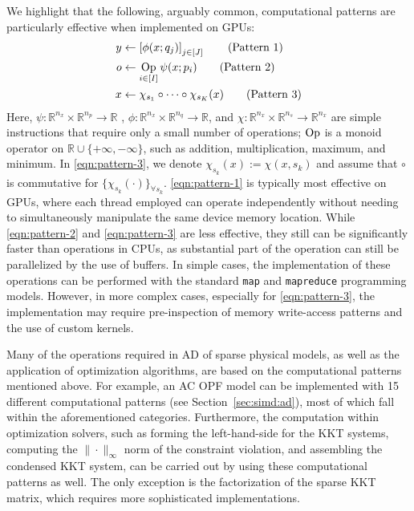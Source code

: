 We highlight that the following, arguably common, computational
patterns are particularly effective when implemented on GPUs:
\begin{align}
  y&\leftarrow \left[\phi(x; q_j)\right]_{j\in [J]}\tag{Pattern 1}\label{eqn:pattern-1}\\
  o&\leftarrow  \mathop{\rm{Op}}_{i\in [I]} \psi(x;p_i) \tag{Pattern 2}\label{eqn:pattern-2}\\
  x&\leftarrow  \chi_{s_1}\circ\cdots\circ \chi_{s_K}(x) \tag{Pattern 3}\label{eqn:pattern-3}
\end{align}
Here, $\psi:\mathbb{R}^{n_x}\times \mathbb{R}^{n_{p}}\rightarrow
\mathbb{R}$ , $\phi:\mathbb{R}^{n_x}\times
\mathbb{R}^{n_{q}}\rightarrow \mathbb{R}$, and
$\chi:\mathbb{R}^{n_x}\times \mathbb{R}^{n_{s}}\rightarrow
\mathbb{R}^{n_x}$ are simple instructions that require only a small number
of operations; $\mathop{\rm{Op}}$ is a monoid operator on
$\mathbb{R}\cup\{+\infty,-\infty\}$, such as addition, multiplication,
maximum, and minimum. In \ref{eqn:pattern-3}, we denote $\chi_{s_k}(x):=\chi(x,s_k)$ and
assume that $\circ$ is commutative for $\{\chi_{s_k}(\cdot)\}_{\forall
s_k}$. \ref{eqn:pattern-1} is typically most effective on GPUs, where
each thread employed can operate independently without needing to
simultaneously manipulate the same device memory location. While
\ref{eqn:pattern-2} and \ref{eqn:pattern-3} are less effective,
they still can be significantly
faster than operations in CPUs, as substantial part of the operation
can still be parallelized by the use of buffers. In simple cases, the
implementation of these operations can be performed with the standard
{\tt map} and {\tt mapreduce} programming models. However, in more
complex cases, especially for \ref{eqn:pattern-3}, the
implementation may require pre-inspection of memory write-access
patterns and the use of custom kernels.

Many of the operations required in AD of sparse physical models, as
well as the application of optimization algorithms, are based on the
computational patterns mentioned above. For example, an AC OPF model can
be implemented with 15 different computational patterns (see Section~\ref{sec:simd:ad}), most of which
fall within the aforementioned categories. Furthermore, the
computation within optimization solvers, such as forming the
left-hand-side for the KKT systems, computing the $\|\cdot\|_\infty$
norm of the constraint violation, and assembling the condensed KKT
system, can be carried out by using these computational patterns as well. The
only exception is the factorization of the sparse KKT matrix, which
requires more sophisticated implementations.

